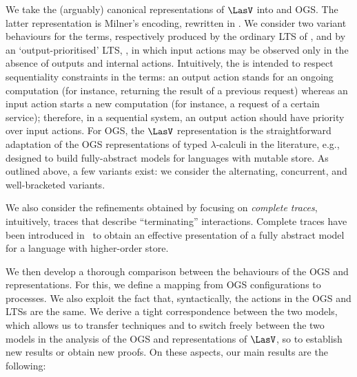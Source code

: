 We take the (arguably) canonical representations of $\LasV$  into \piI 
and OGS.
The latter representation is Milner's encoding,
rewritten in \piI.  We consider two variant  behaviours for the \piI terms, respectively
produced by  the ordinary LTS
of \piI, and by  an `output-prioritised' LTS, \opLTS, 
in which   input actions
may be observed only in the absence of outputs and internal actions. 
Intuitively, the \opLTS is intended to respect sequentiality  constraints in the
\piI terms:  
an  output action stands for an ongoing computation (for instance, returning  the result of
 a previous request) whereas 
an  input
 action starts a 
   new computation
 (for instance, a request of a certain service); therefore,  
in a sequential system, an output action should have priority over input actions.  
 For OGS, the $\LasV$ representation is the straightforward adaptation of the OGS
representations of typed $\lambda$-calculi in the literature, e.g., \cite{laird2007}
designed to build fully-abstract models for languages with mutable store.
As outlined above, a few variants exist:
we consider the  alternating, concurrent,
and well-bracketed variants.

We also consider the refinements obtained by focusing on  \emph{complete traces}, 
intuitively, traces that describe ``terminating'' interactions.
Complete traces have been introduced in~\cite{abramsky1997linearity} to obtain an
effective presentation of a fully abstract model for a language with higher-order store.

We then develop a  thorough comparison between the behaviours of the OGS and \piI
representations. 
For this, we define a mapping from OGS configurations to \piI processes. We also exploit
the fact that, syntactically, the actions in the  OGS and   \piI LTSs are the same.
We derive a tight correspondence between the two models, which allows us to transfer techniques
and  to 
switch  freely between the two models in the analysis of 
the OGS and \piI representations of $\LasV$, 
so to establish new results or obtain new proofs.
On these aspects, our main results  are the following: 


